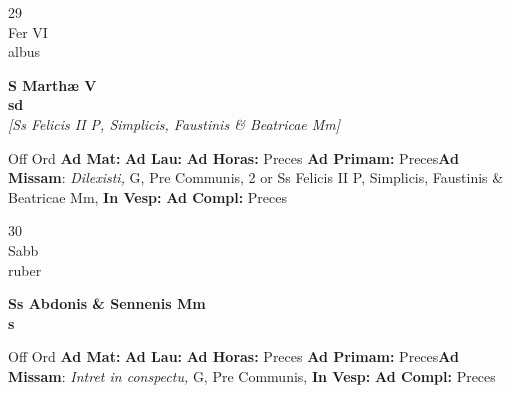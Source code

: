 \documentclass[10pt, openany]{book}
\begin{document}
    \begin{center}
        \begin{minipage}{3.5in}
            \vspace{2em}
            \begin{minipage}{0.5in}
                {\Huge 29} \\
                {\normalsize Fer VI} \\
                {\normalsize albus}
            \end{minipage}
            \begin{minipage}{3.0in}
                \textbf{ \large S Marthæ V \\
                \textnormal{\normalsize sd}} \\ \textit{[Ss Felicis II P, Simplicis, Faustinis \& Beatricae Mm]} \\ 
            \end{minipage}
            \begin{justify}Off Ord
                \textbf{Ad Mat: }
                \textbf{Ad Lau: }
                \textbf{Ad Horas: }Preces
                \textbf{Ad Primam: }Preces\textbf{Ad Missam}: \textit{Dilexisti,} G, Pre Communis, 2 or Ss Felicis II P, Simplicis, Faustinis \& Beatricae Mm,  
                \textbf{In Vesp: }
                \textbf{Ad Compl: }Preces
            \end{justify}
        \end{minipage}
    \end{center}

    \begin{center}
        \begin{minipage}{3.5in}
            \vspace{2em}
            \begin{minipage}{0.5in}
                {\Huge 30} \\
                {\normalsize Sabb} \\
                {\normalsize ruber}
            \end{minipage}
            \begin{minipage}{3.0in}
                \textbf{ \large Ss Abdonis \& Sennenis Mm \\
                \textnormal{\normalsize s}} \\ 
            \end{minipage}
            \begin{justify}Off Ord
                \textbf{Ad Mat: }
                \textbf{Ad Lau: }
                \textbf{Ad Horas: }Preces
                \textbf{Ad Primam: }Preces\textbf{Ad Missam}: \textit{Intret in conspectu,} G, Pre Communis,  
                \textbf{In Vesp: }
                \textbf{Ad Compl: }Preces
            \end{justify}
        \end{minipage}
    \end{center}
\end{document}
